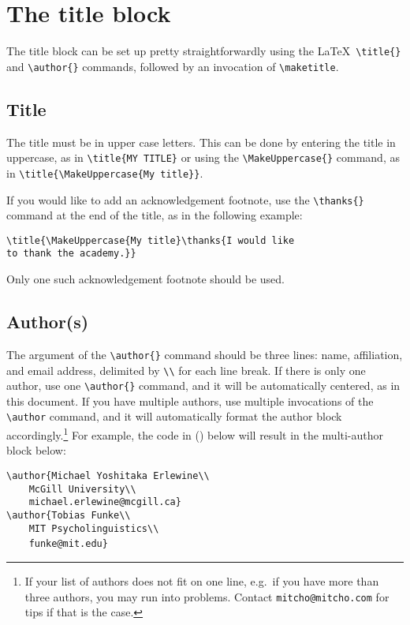\documentclass{afla}
\begin{document}
\section{The title block}

The title block can be set up pretty straightforwardly using the \LaTeX\ \verb`\title{}` and \verb`\author{}` commands, followed by an invocation of \verb`\maketitle`.

\subsection{Title}

The title must be in upper case letters. This can be done by entering the title in uppercase, as in \verb`\title{MY TITLE}` or using the \verb`\MakeUppercase{}` command, as in \verb`\title{\MakeUppercase{My title}}`.

If you would like to add an acknowledgement footnote, use the \verb`\thanks{}` command at the end of the title, as in the following example:

\ex \tt \verb`\title{\MakeUppercase{My title}\thanks{`I would like\\
	to thank the academy.\verb`}}`
\xe
\

\noindent Only one such acknowledgement footnote should be used.

\subsection{Author(s)}

The argument of the \verb`\author{}` command should be three lines: name, affiliation, and email address, delimited by \verb`\\` for each line break. If there is only one author, use one \verb`\author{}` command, and it will be automatically centered, as in this document. If you have multiple authors, use multiple invocations of the \verb`\author` command, and it will automatically format the author block accordingly.\footnote{If your list of authors does not fit on one line, e.g.~if you have more than three authors, you may run into problems. Contact \texttt{mitcho@mitcho.com} for tips if that is the case.} For example, the code in (\nextx) below will result in the multi-author block below:

\ex \verb`\author{Michael Yoshitaka Erlewine\\`\\
	\verb`    McGill University\\`\\
	\verb`    michael.erlewine@mcgill.ca}`\\
	\verb`\author{Tobias Funke\\`\\
	\verb`    MIT Psycholinguistics\\`\\
	\verb`    funke@mit.edu}`
\xe
\
\end{document}

